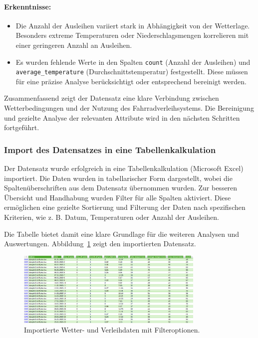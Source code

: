 \documentclass[a4paper,12pt]{article}
\begin{document}
\paragraph{Erkenntnisse:}
\begin{itemize}
    \item Die Anzahl der Ausleihen variiert stark in Abhängigkeit von der Wetterlage. Besonders extreme Temperaturen oder Niederschlagsmengen korrelieren mit einer geringeren Anzahl an Ausleihen.
    \item Es wurden fehlende Werte in den Spalten \texttt{count} (Anzahl der Ausleihen) und \texttt{average\_temperature} (Durchschnittstemperatur) festgestellt. Diese müssen für eine präzise Analyse berücksichtigt oder entsprechend bereinigt werden.
\end{itemize}
Zusammenfassend zeigt der Datensatz eine klare Verbindung zwischen Wetterbedingungen und der Nutzung des Fahrradverleihsystems. Die Bereinigung und gezielte Analyse der relevanten Attribute wird in den nächsten Schritten fortgeführt.

\subsubsection{Import des Datensatzes in eine Tabellenkalkulation}
Der Datensatz wurde erfolgreich in eine Tabellenkalkulation (Microsoft Excel) importiert. Die Daten wurden in tabellarischer Form dargestellt, wobei die Spaltenüberschriften aus dem Datensatz übernommen wurden. Zur besseren Übersicht und Handhabung wurden Filter für alle Spalten aktiviert. Diese ermöglichen eine gezielte Sortierung und Filterung der Daten nach spezifischen Kriterien, wie z. B. Datum, Temperaturen oder Anzahl der Ausleihen.

Die Tabelle bietet damit eine klare Grundlage für die weiteren Analysen und Auswertungen. Abbildung~\ref{fig:data_table} zeigt den importierten Datensatz.

\begin{figure}[h!]
\centering
\includegraphics[width=0.8\textwidth]{20241201_18124556.png}
\caption{Importierte Wetter- und Verleihdaten mit Filteroptionen.}
\label{fig:data_table}
\end{figure}
\end{document}

